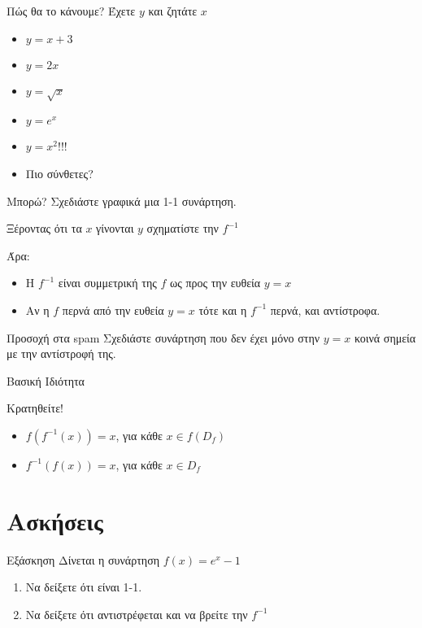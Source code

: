 \documentclass[greek]{beamer}
\begin{document}
\begin{frame}{Πώς θα το κάνουμε?}
  Έχετε $y$ και ζητάτε $x$ \pause
  \begin{itemize}
    \item $y=x+3$ \pause
    \item $y=2x$ \pause
    \item $y=\sqrt{x}$ \pause
    \item $y=e^x$ \pause
    \item $y=x^2$!!! \pause
    \item Πιο σύνθετες?
  \end{itemize}
\end{frame}

\begin{frame}{Μπορώ?}
  Σχεδιάστε γραφικά μια 1-1 συνάρτηση. \pause

  Ξέροντας ότι τα $x$ γίνονται $y$ σχηματίστε την $f^{-1}$ \pause

  Άρα:
  \begin{itemize}
    \item Η $f^{-1}$ είναι συμμετρική της $f$ ως προς την ευθεία $y=x$ \pause
    \item Αν η $f$ περνά από την ευθεία $y=x$ τότε και η $f^{-1}$ περνά, και αντίστροφα.
  \end{itemize} \pause
  \begin{alertblock}{Προσοχή στα spam}
    Σχεδιάστε συνάρτηση που δεν έχει μόνο στην $y=x$ κοινά σημεία με την αντίστροφή της.
  \end{alertblock}
\end{frame}

\begin{frame}{Βασική Ιδιότητα}
  \begin{exampleblock}{Κρατηθείτε!}
    \begin{itemize}
      \item $f\left(f^{-1}(x)\right)=x$, για κάθε $x\in f(D_f)$ \pause
      \item $f^{-1}\left(f(x)\right)=x$, για κάθε $x\in D_f$
    \end{itemize}
  \end{exampleblock}
\end{frame}

\section{Ασκήσεις}
\begin{frame}{Εξάσκηση}
  Δίνεται η συνάρτηση $f(x)=e^x-1$
  \begin{enumerate}
    \item Να δείξετε ότι είναι 1-1. \pause
    \item Να δείξετε ότι αντιστρέφεται και να βρείτε την $f^{-1}$
  \end{enumerate}
\end{frame}
\end{document}
